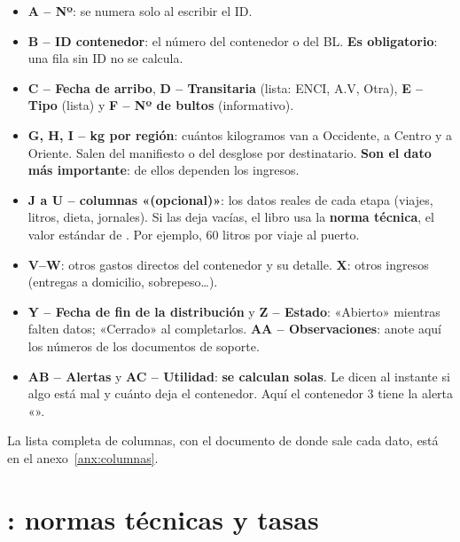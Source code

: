 \begin{itemize}
  \item \textbf{A – Nº}: se numera solo al escribir el ID.
  \item {} \textbf{B – ID contenedor}: el número del contenedor o del BL. \textbf{Es obligatorio}: una fila sin ID no se calcula.
  \item {} \textbf{C – Fecha de arribo}, \textbf{D – Transitaria} (lista: ENCI, A.V, Otra), \textbf{E – Tipo} (lista) y
        \textbf{F – Nº de bultos} (informativo).
  \item {} \textbf{G, H, I – kg por región}: cuántos kilogramos van a Occidente, a Centro y a Oriente. Salen del manifiesto o
        del desglose por destinatario. \textbf{Son el dato más importante}: de ellos dependen los ingresos.
  \item {} \textbf{J a U – columnas «(opcional)»}: los datos reales de cada etapa (viajes, litros, dieta, jornales). Si las deja vacías,
        el libro usa la \textbf{norma técnica}, el valor estándar de . Por ejemplo, 60 litros por viaje al puerto.
\end{itemize}

\begin{itemize}
  \item \textbf{V–W}: otros gastos directos del contenedor y su detalle. \textbf{X}: otros ingresos (entregas a domicilio, sobrepeso\dots).
  \item {} \textbf{Y – Fecha de fin de la distribución} y \textbf{Z – Estado}: «Abierto» mientras falten datos; «Cerrado» al completarlos.
        \textbf{AA – Observaciones}: anote aquí los números de los documentos de soporte.
  \item {} \textbf{AB – Alertas} y \textbf{AC – Utilidad}: \textbf{se calculan solas}. Le dicen al instante si algo está mal y cuánto deja
        el contenedor. Aquí el contenedor 3 tiene la alerta «\vAlertaTres».
\end{itemize}

La lista completa de columnas, con el documento de donde sale cada dato, está en el anexo~\ref{anx:columnas}.

\section{: normas técnicas y tasas}

